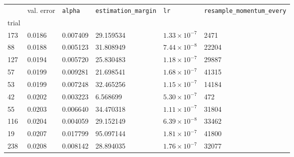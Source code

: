 \begin{tabular}{lp{2cm}p{2cm}p{2cm}p{2cm}p{2cm}}
\toprule
{} &  val. error &  \texttt{alpha} &  \texttt{estimation\_margin} &         \texttt{lr} &  \texttt{resample\_momentum\_every} \\
trial &             &                 &                              &                     &                                     \\
\midrule
173   &      0.0186 &        0.007409 &                    29.159534 & $1.33\times10^{-7}$ &                                2471 \\
88    &      0.0188 &        0.005123 &                    31.808949 & $7.44\times10^{-8}$ &                               22204 \\
127   &      0.0194 &        0.005720 &                    25.830483 & $1.18\times10^{-7}$ &                               29887 \\
57    &      0.0199 &        0.009281 &                    21.698541 & $1.68\times10^{-7}$ &                               41315 \\
53    &      0.0199 &        0.007248 &                    32.465256 & $1.15\times10^{-7}$ &                               14184 \\
42    &      0.0202 &        0.003223 &                     6.568699 & $5.30\times10^{-7}$ &                                 472 \\
55    &      0.0203 &        0.006640 &                    34.470318 & $1.11\times10^{-7}$ &                               31804 \\
116   &      0.0204 &        0.004059 &                    29.152149 & $6.39\times10^{-8}$ &                               33462 \\
19    &      0.0207 &        0.017799 &                    95.097144 & $1.81\times10^{-7}$ &                               41800 \\
238   &      0.0208 &        0.008142 &                    28.894035 & $1.76\times10^{-7}$ &                               32077 \\
\bottomrule
\end{tabular}
